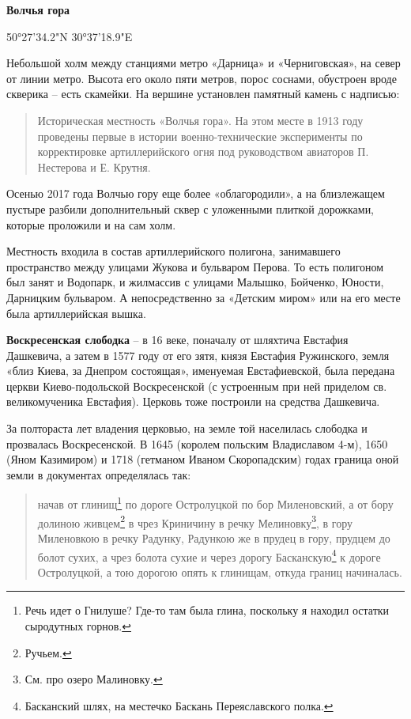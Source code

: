 \medskip

\textbf{Волчья гора} 

50°27'34.2"N 30°37'18.9"E

Небольшой холм между станциями метро «Дарница» и «Черниговская», на север от линии метро. Высота его около пяти метров, порос соснами, обустроен вроде скверика – есть скамейки. На вершине установлен памятный камень с надписью: 

\begin{quotation}
\noindent Историческая местность «Волчья гора». На этом месте в 1913 году проведены первые в истории военно-техни\-ческие эксперименты по корректировке артиллерийского огня под руководством авиаторов П. Нестерова и Е. Крутня.
\end{quotation}

Осенью 2017 года Волчью гору еще более «облагородили», а на близлежащем пустыре разбили дополнительный сквер с уложенными плиткой дорожками, которые проложили и на сам холм.

Местность входила в состав артиллерийского полигона, занимавшего пространство между улицами Жукова и бульваром Перова. То есть  полигоном был занят и Водопарк, и жилмассив с улицами Малышко, Бойченко, Юности, Дарницким бульваром. А непосредственно за «Детским миром» или на его месте была артиллерийская вышка.\\

\medskip


\textbf{Воскресенская слободка} – в 16 веке, поначалу от шляхтича Евстафия Дашкевича, а затем в 1577 году от его зятя, князя Евстафия Ружинского, земля «близ Киева, за Днепром состоящая», именуемая Евстафиевской, была передана церкви Киево-подольской Воскресенской (с устроенным при ней приделом св. великомученика Евстафия). Церковь тоже построили на средства Дашкевича.

За полтораста лет владения церковью, на земле той населилась слободка и прозвалась Воскресенской. В 1645 (королем польским Владиславом 4-м), 1650 (Яном Казимиром) и 1718 (гетманом Иваном Скоропадским) годах граница оной земли в документах определялась так:

\begin{quotation}
\noindent начав от глинищ\footnote{Речь идет о Гнилуше? Где-то там была глина, поскольку я находил остатки сыродутных горнов.} по дороге Остролуцкой по бор Миленовский, а от бору долиною живцем\footnote{Ручьем.} в чрез Криничину в речку Мелиновку\footnote{См. про озеро Малиновку.}, в гору Миленовкою в речку Радунку, Радункою же в прудец в гору, прудцем до болот сухих, а чрез болота сухие и через дорогу Басканскую\footnote{Басканский шлях, на местечко Баскань Переяславского полка.} к дороге Остролуцкой, а тою дорогою опять к глинищам, откуда границ начиналась.
\end{quotation}

